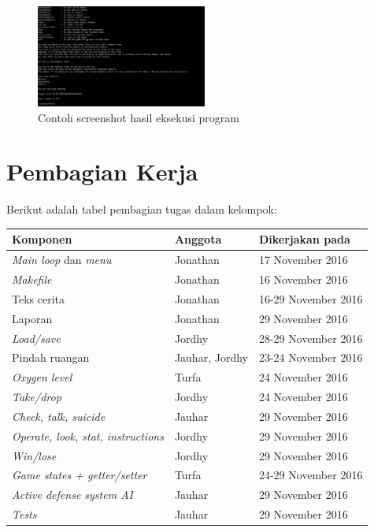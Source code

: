\documentclass[a4paper,titlepage]{article}
\begin{document}
		\begin{figure}[h]
		    \centering
		    \includegraphics[width=0.5\textwidth]{demo.PNG}
		    \caption{Contoh screenshot hasil eksekusi program}
		    \label{fig:hasileksekusi}
		\end{figure}

		

	\section{Pembagian Kerja}

		\noindent Berikut adalah tabel pembagian tugas dalam kelompok:

		\begin{table}[H]
			\centering
			\begin{tabular}{@{}lll@{}}
				\toprule
				Komponen & Anggota & Dikerjakan pada \\ \midrule
				\textit{Main loop} dan \textit{menu} & Jonathan & 17 November 2016 \\
				\textit{Makefile} & Jonathan & 16 November 2016 \\
				Teks cerita & Jonathan & 16-29 November 2016 \\
				Laporan & Jonathan & 29 November 2016 \\
				\textit{Load/save} & Jordhy & 28-29 November 2016 \\
				Pindah ruangan & Jauhar, Jordhy & 23-24 November 2016 \\
				\textit{Oxygen level} & Turfa & 24 November 2016 \\
				\textit{Take/drop} & Jordhy & 24 November 2016 \\
				\textit{Check, talk, suicide} & Jauhar & 29 November 2016 \\
				\textit{Operate, look, stat, instructions} & Jordhy & 29 November 2016 \\
				\textit{Win/lose} & Jordhy & 29 November 2016 \\
				\textit{Game states + getter/setter} & Turfa & 24-29 November 2016 \\
				\textit{Active defense system AI} & Jauhar & 29 November 2016 \\
				\textit{Tests} & Jauhar & 29 November 2016 \\
			\end{tabular}
		\end{table}
\end{document}
